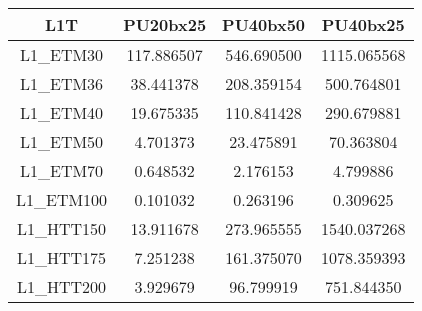 
\begin{tabular}{|c||c|c|c|}
\hline
L1T & PU20bx25 & PU40bx50 & PU40bx25 \\
\hline \hline
L1\_ETM30 & 117.886507 & 546.690500 & 1115.065568 \\
L1\_ETM36 & 38.441378 & 208.359154 & 500.764801 \\
L1\_ETM40 & 19.675335 & 110.841428 & 290.679881 \\
L1\_ETM50 & 4.701373 & 23.475891 & 70.363804 \\
L1\_ETM70 & 0.648532 & 2.176153 & 4.799886 \\
L1\_ETM100 & 0.101032 & 0.263196 & 0.309625 \\
L1\_HTT150 & 13.911678 & 273.965555 & 1540.037268 \\
L1\_HTT175 & 7.251238 & 161.375070 & 1078.359393 \\
L1\_HTT200 & 3.929679 & 96.799919 & 751.844350 \\
\hline
\end{tabular}

